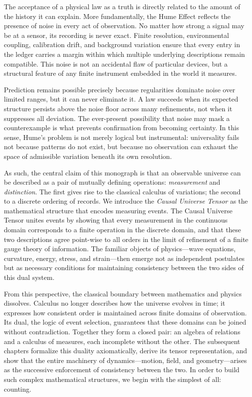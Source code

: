 The acceptance of a physical law as a truth is directly related to the amount of the history
it can explain.
More fundamentally, the Hume Effect reflects the presence of noise in every act
of observation. No matter how strong a signal may be at a sensor, its recording
is never exact. Finite resolution, environmental coupling, calibration drift,
and background variation ensure that every entry in the ledger carries a margin
within which multiple underlying descriptions remain compatible. This noise is
not an accidental flaw of particular devices, but a structural feature of any
finite instrument embedded in the world it measures.

Prediction remains possible precisely because regularities dominate noise over
limited ranges, but it can never eliminate it. A law succeeds when its expected
structure persists above the noise floor across many refinements, not when it
suppresses all deviation. The ever-present possibility that noise may mask a
counterexample is what prevents confirmation from becoming certainty. In this
sense, Hume’s problem is not merely logical but instrumental: universality fails
not because patterns do not exist, but because no observation can exhaust the
space of admissible variation beneath its own resolution.


As such, the central claim of this monograph is that an observable universe can be described
as a pair of mutually defining operations: \emph{measurement} and \emph{distinction}.
The first gives rise to the classical calculus of variations; the second to a discrete
ordering of records.  We introduce the \emph{Causal Universe Tensor} as the mathematical
structure that encodes measuring events.  The Causal Universe Tensor unites events by showing that every
measurement in the continuous domain corresponds to a finite operation in
the discrete domain, and that these two descriptions agree point-wise to
all orders in the limit of refinement of a finite gauge theory of information.  
The familiar objects of physics—wave equations, curvature,
energy, stress, and strain—then emerge not as independent postulates but as
necessary conditions for maintaining consistency between the two sides of
this dual system.

From this perspective, the classical boundary between mathematics and
physics dissolves.  Calculus no longer describes how the universe evolves
in time; it expresses how consistent order is maintained across finite
domains of observation.  Its dual, the logic of event selection, guarantees
that these domains can be joined without contradiction.  Together they
form a closed pair: an algebra of relations and a calculus of measures,
each incomplete without the other.  The subsequent chapters formalize this
duality axiomatically, derive its tensor representation, and show that the
entire machinery of dynamics—motion, field, and geometry—arises as the
successive enforcement of consistency between the two.  In order to build
such complex mathematical structures, we begin with the simplest of all:
counting.


